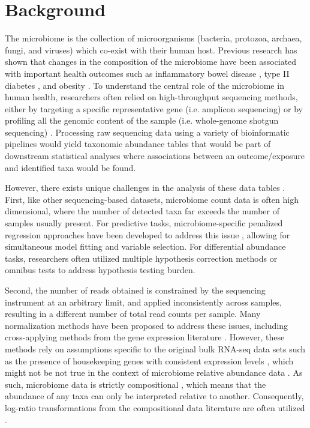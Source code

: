 \documentclass{article}
\begin{document}
\section*{Background}  
The microbiome is the collection of microorganisms (bacteria, protozoa, archaea, fungi, and viruses) which co-exist with their human host. Previous research has shown that changes in the composition of the microbiome have been associated with important health outcomes such as inflammatory bowel disease \cite{proctor2019}, type II diabetes \cite{sharma2019}, and obesity \cite{aoun2020}. To understand the central role of the microbiome in human health, researchers often relied on high-throughput sequencing methods, either by targeting a specific representative gene (i.e. amplicon sequencing) or by profiling all the genomic content of the sample (i.e. whole-genome shotgun sequencing) \cite{cho2012}. Processing raw sequencing data using a variety of bioinformatic pipelines \cite{callahan2016,truong2015} would yield taxonomic abundance tables that would be part of downstream statistical analyses where associations between an outcome/exposure and identified taxa would be found.  

However, there exists unique challenges in the analysis of these data tables \cite{li2019,li2015}. First, like other sequencing-based datasets, microbiome count data is often high dimensional, where the number of detected taxa far exceeds the number of samples usually present. For predictive tasks, microbiome-specific penalized regression approaches have been developed to address this issue \cite{shi2016}, allowing for simultaneous model fitting and variable selection. For differential abundance tasks, researchers often utilized multiple hypothesis correction methods \cite{sankaran2014,benjamini1995} or omnibus tests \cite{chen2018} to address hypothesis testing burden. 

Second, the number of reads obtained is constrained by the sequencing instrument at an arbitrary limit, and applied inconsistently across samples, resulting in a different number of total read counts per sample. Many normalization methods \cite{weiss2017} have been proposed to address these issues, including cross-applying methods from the gene expression literature \cite{mcmurdie2014}. However, these methods rely on assumptions specific to the original bulk RNA-seq data sets such as the presence of housekeeping genes with consistent expression levels \cite{love2014}, which might not be not true in the context of microbiome relative abundance data \cite{quinn2019,quinn2018b}. As such, microbiome data is strictly compositional \cite{gloor2017}, which means that the abundance of any taxa can only be interpreted relative to another. Consequently, log-ratio transformations from the compositional data literature are often utilized \cite{aitchison1999}. 
\end{document}
